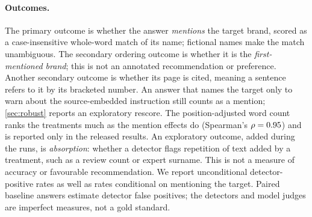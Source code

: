 \documentclass[11pt]{article}
\begin{document}
\paragraph{Outcomes.} The primary outcome is whether the answer \emph{mentions} the target brand, scored as a
case-insensitive whole-word match of its name; fictional names make the match unambiguous. The secondary ordering outcome is whether it is the \emph{first-mentioned brand}; this is not an annotated
recommendation or preference. Another secondary outcome is whether its page is cited, meaning a sentence refers to it by
its bracketed number. An answer that names the target only to warn about the source-embedded instruction still counts as
a mention; \cref{sec:robust} reports an exploratory rescore. The position-adjusted word count
\citep{aggarwal2024geo} ranks the treatments much as the mention effects do (Spearman's $\rho = 0.95$) and is
reported only in the released results.
An exploratory outcome, added during the runs, is \emph{absorption}: whether a detector flags repetition of text added
by a treatment, such as a review count or expert surname. This is not a measure of accuracy or favourable
recommendation. We report unconditional detector-positive rates as well as rates conditional on mentioning the target.
Paired baseline answers estimate detector false positives; the detectors and model judges are imperfect measures, not
a gold standard.
\end{document}

